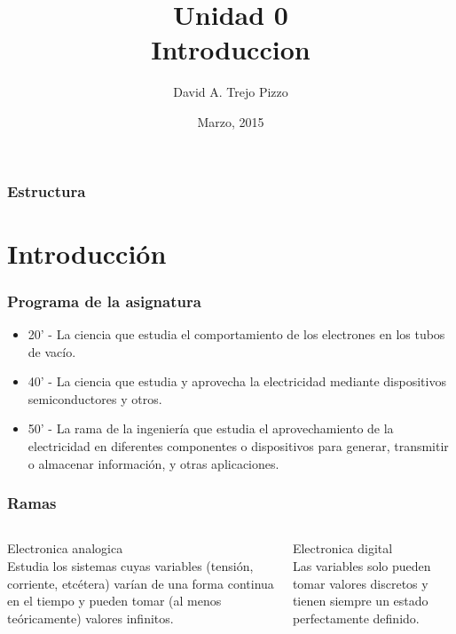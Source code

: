 \documentclass{beamer}
\title[Seminario de tecnologia]{Unidad 0\\ Introduccion}
\author{David A. Trejo Pizzo}
\institute[Instituto Multimedial Da Vinci]
{Instituto Multimedial Da Vinci\\
\medskip
\textit{dtrejopizzo@gmail.com}}
\date{Marzo, 2015}
\begin{document}
\begin{frame}
\titlepage
\end{frame}


\begin{frame}
\frametitle{Estructura}
\tableofcontents
\end{frame}




\section{Introducción}

\begin{frame}
\frametitle{Programa de la asignatura}

\begin{itemize}
\item 20' - La ciencia que estudia el comportamiento de los electrones en los tubos de vacío.
\item 40' - La ciencia que estudia y aprovecha la electricidad mediante dispositivos semiconductores y otros.
\item 50' - La rama de la ingeniería que estudia el aprovechamiento de la electricidad en diferentes componentes o dispositivos para generar, transmitir o almacenar información, y otras aplicaciones.
\end{itemize}
\end{frame}

\begin{frame}
\frametitle{Ramas}
\begin{columns}[c]

Electronica analogica\\

Estudia los sistemas cuyas variables (tensión, corriente, etcétera) varían de una forma continua en el tiempo y pueden tomar (al menos teóricamente) valores infinitos.

Electronica digital\\

Las variables solo pueden tomar valores discretos y tienen siempre un estado perfectamente definido.

\end{columns}
\end{frame}
\end{document}
